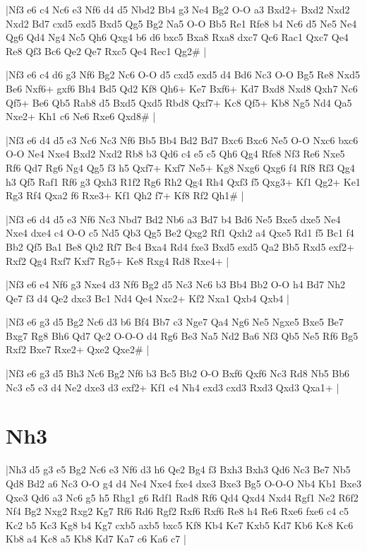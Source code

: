 \whitename{}
\blackname{}
\makegametitle
|Nf3 e6 c4 Nc6 e3 Nf6 d4 d5 Nbd2 Bb4 g3 Ne4 Bg2 O-O a3 Bxd2+ Bxd2 Nxd2 Nxd2 Bd7 cxd5 exd5 Bxd5 Qg5 Bg2 Na5 O-O Bb5 Re1 Rfe8 b4 Nc6 d5 Ne5 Ne4 Qg6 Qd4 Ng4 Nc5 Qh6 Qxg4 b6 d6 bxc5 Bxa8 Rxa8 dxc7 Qc6 Rac1 Qxc7 Qe4 Re8 Qf3 Bc6 Qe2 Qe7 Rxc5 Qe4 Rec1 Qg2\#  |

\whitename{}
\blackname{}
\makegametitle
|Nf3 e6 c4 d6 g3 Nf6 Bg2 Nc6 O-O d5 cxd5 exd5 d4 Bd6 Nc3 O-O Bg5 Re8 Nxd5 Be6 Nxf6+ gxf6 Bh4 Bd5 Qd2 Kf8 Qh6+ Ke7 Bxf6+ Kd7 Bxd8 Nxd8 Qxh7 Nc6 Qf5+ Be6 Qb5 Rab8 d5 Bxd5 Qxd5 Rbd8 Qxf7+ Kc8 Qf5+ Kb8 Ng5 Nd4 Qa5 Nxe2+ Kh1 c6 Ne6 Rxe6 Qxd8\#  |

\whitename{}
\blackname{}
\makegametitle
|Nf3 e6 d4 d5 e3 Nc6 Nc3 Nf6 Bb5 Bb4 Bd2 Bd7 Bxc6 Bxc6 Ne5 O-O Nxc6 bxc6 O-O Ne4 Nxe4 Bxd2 Nxd2 Rb8 b3 Qd6 c4 e5 c5 Qh6 Qg4 Rfe8 Nf3 Re6 Nxe5 Rf6 Qd7 Rg6 Ng4 Qg5 f3 h5 Qxf7+ Kxf7 Ne5+ Kg8 Nxg6 Qxg6 f4 Rf8 Rf3 Qg4 h3 Qf5 Raf1 Rf6 g3 Qxh3 R1f2 Rg6 Rh2 Qg4 Rh4 Qxf3 f5 Qxg3+ Kf1 Qg2+ Ke1 Rg3 Rf4 Qxa2 f6 Rxe3+ Kf1 Qh2 f7+ Kf8 Rf2 Qh1\#  |

\whitename{}
\blackname{}
\makegametitle
|Nf3 e6 d4 d5 e3 Nf6 Nc3 Nbd7 Bd2 Nb6 a3 Bd7 b4 Bd6 Ne5 Bxe5 dxe5 Ne4 Nxe4 dxe4 c4 O-O c5 Nd5 Qb3 Qg5 Be2 Qxg2 Rf1 Qxh2 a4 Qxe5 Rd1 f5 Bc1 f4 Bb2 Qf5 Ba1 Be8 Qb2 Rf7 Bc4 Bxa4 Rd4 fxe3 Bxd5 exd5 Qa2 Bb5 Rxd5 exf2+ Rxf2 Qg4 Rxf7 Kxf7 Rg5+ Ke8 Rxg4 Rd8 Rxe4+  |

\whitename{}
\blackname{}
\makegametitle
|Nf3 e6 e4 Nf6 g3 Nxe4 d3 Nf6 Bg2 d5 Nc3 Nc6 b3 Bb4 Bb2 O-O h4 Bd7 Nh2 Qe7 f3 d4 Qe2 dxc3 Bc1 Nd4 Qe4 Nxc2+ Kf2 Nxa1 Qxb4 Qxb4  |

\whitename{}
\blackname{}
\makegametitle
|Nf3 e6 g3 d5 Bg2 Nc6 d3 b6 Bf4 Bb7 c3 Nge7 Qa4 Ng6 Ne5 Ngxe5 Bxe5 Be7 Bxg7 Rg8 Bh6 Qd7 Qc2 O-O-O d4 Rg6 Be3 Na5 Nd2 Ba6 Nf3 Qb5 Ne5 Rf6 Bg5 Rxf2 Bxe7 Rxe2+ Qxe2 Qxe2\#  |

\whitename{}
\blackname{}
\makegametitle
|Nf3 e6 g3 d5 Bh3 Nc6 Bg2 Nf6 b3 Bc5 Bb2 O-O Bxf6 Qxf6 Nc3 Rd8 Nb5 Bb6 Nc3 e5 e3 d4 Ne2 dxe3 d3 exf2+ Kf1 e4 Nh4 exd3 cxd3 Rxd3 Qxd3 Qxa1+  |

\section{Nh3}

\whitename{}
\blackname{}
\makegametitle
|Nh3 d5 g3 e5 Bg2 Nc6 e3 Nf6 d3 h6 Qe2 Bg4 f3 Bxh3 Bxh3 Qd6 Nc3 Be7 Nb5 Qd8 Bd2 a6 Nc3 O-O g4 d4 Ne4 Nxe4 fxe4 dxe3 Bxe3 Bg5 O-O-O Nb4 Kb1 Bxe3 Qxe3 Qd6 a3 Nc6 g5 h5 Rhg1 g6 Rdf1 Rad8 Rf6 Qd4 Qxd4 Nxd4 Rgf1 Ne2 R6f2 Nf4 Bg2 Nxg2 Rxg2 Kg7 Rf6 Rd6 Rgf2 Rxf6 Rxf6 Re8 h4 Re6 Rxe6 fxe6 c4 c5 Kc2 b5 Kc3 Kg8 b4 Kg7 cxb5 axb5 bxc5 Kf8 Kb4 Ke7 Kxb5 Kd7 Kb6 Kc8 Kc6 Kb8 a4 Kc8 a5 Kb8 Kd7 Ka7 c6 Ka6 c7  |

